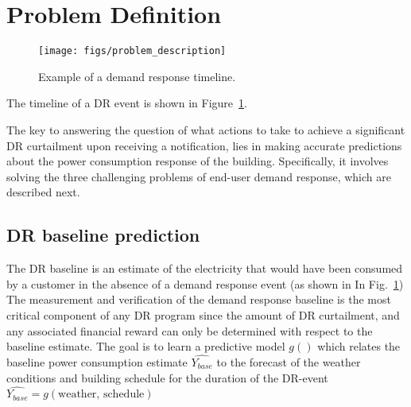 \documentclass{sig-alternate-ipsn13}
\theoremstyle{definition}
\begin{document}
\section{Problem Definition}
\label{sec:problem}
\begin{figure}
  \centering
  \texttt{[image: figs/problem\_description]}
  \vspace{-3pt}
  \caption{Example of a demand response timeline.}
  \label{fig:baseline}
   \vspace{-17pt}
\end{figure}

The timeline of a DR event is shown in Figure~\ref{fig:baseline}.

The key to answering the question of what actions to take to achieve a significant DR curtailment upon receiving a notification, lies in making accurate predictions about the power consumption response of the building. 
Specifically, it involves solving the three challenging problems of end-user demand response, which are described next.


\subsection{DR baseline prediction}
\label{sec:baselining}
The DR baseline is an estimate of the electricity that would have been consumed by a customer in the absence of a demand response event (as shown in In Fig.~\ref{fig:baseline}) 
The measurement and verification of the demand response baseline is the most critical component of any DR program since the amount of DR curtailment, and any associated financial reward can only be determined with respect to the baseline estimate.
The goal is to learn a predictive model $g()$ which relates the baseline power consumption estimate $\hat{Y_{base}}$ to the forecast of the weather conditions and building schedule for the duration of the DR-event \ie $\hat{Y_{base}} = g(\text{weather, schedule})$
\end{document}
